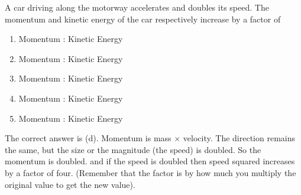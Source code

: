 
\begin{problem}[Robin1]
{A car driving along the motorway accelerates and doubles its speed. The momentum and kinetic energy of the car respectively increase by a factor of
\begin{enumerate}
	\item Momentum  \quad : \quad Kinetic Energy 
	\item Momentum  \quad : \quad Kinetic Energy  
	\item Momentum  \quad : \quad Kinetic Energy 
	\item Momentum  \quad : \quad Kinetic Energy  \answer
	\item Momentum  \quad : \quad Kinetic Energy 
\end{enumerate}
}
{}
{The correct answer is (d).  Momentum is mass $\times$ velocity. The direction remains the same, but the size or the magnitude (the speed) is doubled. So the momentum is doubled.  and if the speed is doubled then speed squared increases by a factor of four. (Remember that the factor is by how much you multiply the original value to get the new value).}
\end{problem}